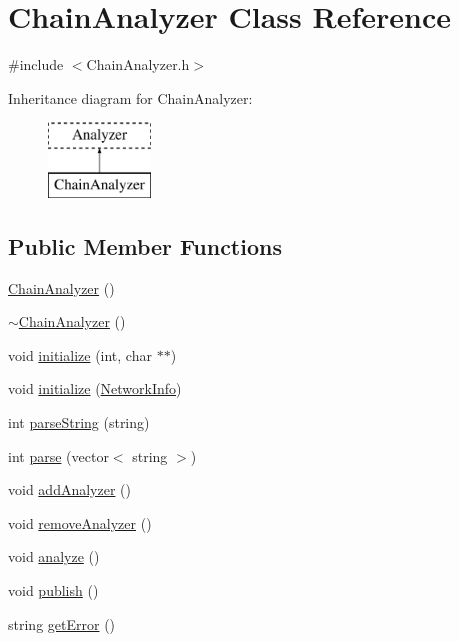 \hypertarget{class_chain_analyzer}{}\section{Chain\+Analyzer Class Reference}
\label{class_chain_analyzer}


{\ttfamily \#include $<$Chain\+Analyzer.\+h$>$}

Inheritance diagram for Chain\+Analyzer\+:\begin{figure}[H]
\begin{center}
\leavevmode
\includegraphics[height=2.000000cm]{class_chain_analyzer}
\end{center}
\end{figure}
\subsection*{Public Member Functions}
\begin{DoxyCompactItemize}
\item 
\mbox{\hyperlink{class_chain_analyzer_a5838d995d24865111ad93c07159eea70}{Chain\+Analyzer}} ()
\item 
\mbox{\hyperlink{class_chain_analyzer_a73079c72ffaf87957854ff6623830d6b}{$\sim$\+Chain\+Analyzer}} ()
\item 
void \mbox{\hyperlink{class_chain_analyzer_aac68bba73899bc53d6cd3c05877d9f85}{initialize}} (int, char $\ast$$\ast$)
\item 
void \mbox{\hyperlink{class_chain_analyzer_a1252905ce86f9e730263b083f85909f9}{initialize}} (\mbox{\hyperlink{struct_network_info}{Network\+Info}})
\item 
int \mbox{\hyperlink{class_chain_analyzer_a1beb2eb3b6bb4d12134e27b0328d8947}{parse\+String}} (string)
\item 
int \mbox{\hyperlink{class_chain_analyzer_a8ab1d495a31f6ec82544165d18f34d01}{parse}} (vector$<$ string $>$)
\item 
void \mbox{\hyperlink{class_chain_analyzer_a48f4f1f65d4eb2bd551ec6895b41ff51}{add\+Analyzer}} ()
\item 
void \mbox{\hyperlink{class_chain_analyzer_a836517181436aa5402ddd01374a496dd}{remove\+Analyzer}} ()
\item 
void \mbox{\hyperlink{class_chain_analyzer_a01d1323c8b1ef850d299c5625c2c97f2}{analyze}} ()
\item 
void \mbox{\hyperlink{class_chain_analyzer_a37568296a227c8f859917e765ab05dc2}{publish}} ()
\item 
string \mbox{\hyperlink{class_chain_analyzer_ae8cd5d49f3f41c4fd25baea14a80f929}{get\+Error}} ()
\end{DoxyCompactItemize}
